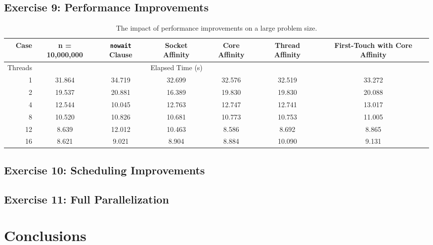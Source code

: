 \documentclass{article}
\begin{document}
\subsection{Exercise 9: Performance Improvements}

\begin{table}[h!]
	\centering
	\caption{The impact of performance improvements on a large problem size.}
	\label{tbl:speedup}
	\begin{tabular}{r|cccccc}
		Case & n = 10,000,000 & \verb|nowait| Clause & Socket Affinity & Core Affinity & Thread Affinity & First-Touch with Core Affinity \\
		\hline
		Threads & \multicolumn{5}{c}{Elapsed Time (s)} \\
		\hline
		1 & 31.864 & 34.719 & 32.699 & 32.576 & 32.519 & 33.272 \\
		2 & 19.537 & 20.881 & 16.389 & 19.830 & 19.830 & 20.088 \\
		4 & 12.544 & 10.045 & 12.763 & 12.747 & 12.741 & 13.017 \\
		8 & 10.520 & 10.826 & 10.681 & 10.773 & 10.753 & 11.005 \\
		12 & 8.639 & 12.012 & 10.463 & 8.586 & 8.692 & 8.865 \\
		16 & 8.621 & 9.021 & 8.904 & 8.884 & 10.090 & 9.131
	\end{tabular}
\end{table}

\subsection{Exercise 10: Scheduling Improvements}

\subsection{Exercise 11: Full Parallelization}

\section{Conclusions}
\end{document}

